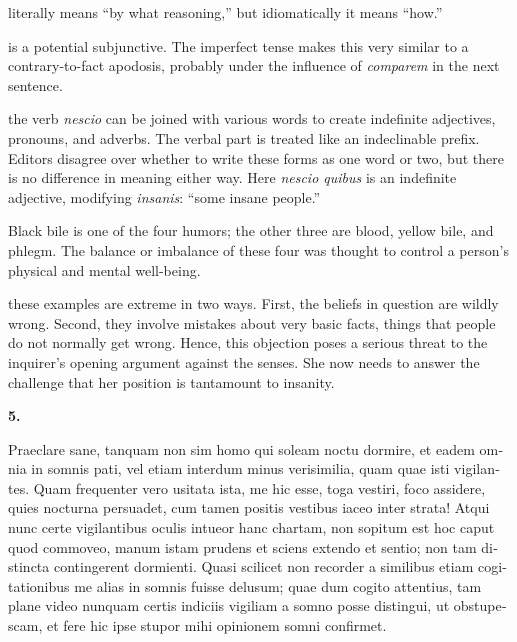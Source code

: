  literally means ``by what reasoning,'' but idiomatically it means ``how.''

 is a potential subjunctive. The imperfect tense makes this very similar to a contrary-to-fact apodosis, probably under the influence of \textit{comparem} in the next sentence.

 the verb \textit{nescio} can be joined with various words to create indefinite adjectives, pronouns, and adverbs. The verbal part is treated like an indeclinable prefix. Editors disagree over whether to write these forms as one word or two, but there is no difference in meaning either way. Here \textit{nescio quibus} is an indefinite adjective, modifying \textit{insanis}: ``some insane people.''

 Black bile is one of the four humors; the other three are blood, yellow bile, and phlegm. The balance or imbalance of these four was thought to control a person's physical and mental well-being.

 these examples are extreme in two ways. First, the beliefs in question are wildly wrong. Second, they involve mistakes about very basic facts, things that people do not normally get wrong. Hence, this objection poses a serious threat to the inquirer's opening argument against the senses. She now needs to answer the challenge that her position is tantamount to insanity.

\clearpage

\beginnumbering
\pstart
\textbf{5.} \begin{latin}Praeclare sane, tanquam non sim homo qui soleam noctu dormire, et eadem omnia in somnis pati, vel etiam interdum minus verisimilia, quam quae isti vigilantes. Quam frequenter vero usitata ista, me hic esse, toga vestiri, foco assidere, quies nocturna persuadet, cum tamen positis vestibus iaceo inter strata! Atqui nunc certe vigilantibus oculis intueor hanc chartam, non sopitum est hoc caput quod commoveo, manum istam prudens et sciens extendo et sentio; non tam distincta contingerent dormienti. Quasi scilicet non recorder a similibus etiam cogitationibus me alias in somnis fuisse delusum; quae dum cogito attentius, tam plane video nunquam certis indiciis vigiliam a somno posse distingui, ut obstupescam, et fere hic ipse stupor mihi opinionem somni confirmet.\end{latin}
\pend
\endnumbering


